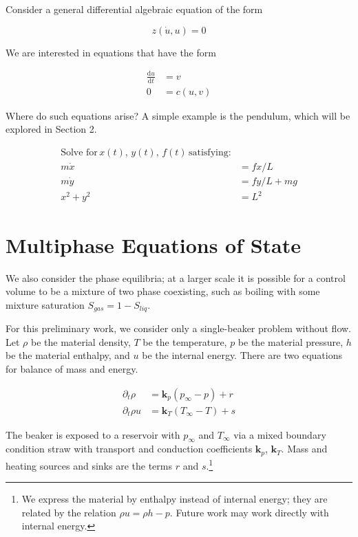 \documentclass[]{article}
\begin{document}
Consider a general differential algebraic equation of the form

\begin{equation}
z(\dot{u},u) = 0
\end{equation}

We are interested in equations that have the form

\begin{align}
\frac{\mathrm{d}u}{\mathrm{d}t} & = v \\
0 & = c(u,v)
\end{align}

Where do such equations arise? A simple example is the pendulum, which
will be explored in Section 2.

\begin{align}
\text{Solve for}\, x(t), \, y(t), \, f(t) \, \text{satisfying:} \\
m \dot{x} & = f x/L \\
m \dot{y} & = f y/L + m g \\
x^2 + y^2 & = L^2
\end{align}

\hypertarget{header-n3234}{%
\section{Multiphase Equations of State}\label{header-n3234}}

We also consider the phase equilibria; at a larger scale it is possible
for a control volume to be a mixture of two phase coexisting, such as
boiling with some mixture saturation \(S_{gas}=1-S_{liq}\).

For this preliminary work, we consider only a single-beaker problem
without flow. Let \(\rho\) be the material density, \(T\) be the
temperature, \(p\) be the material pressure, \(h\) be the material
enthalpy, and \(u\) be the internal energy. There are two equations for
balance of mass and energy.

\begin{align}
\partial_t \rho & = \mathbf{k}_p(p_\infty - p) + r\\
\partial_t \rho u & = \mathbf{k}_T(T_\infty-T) + s
\end{align}

The beaker is exposed to a reservoir with \(p_\infty\) and \(T_\infty\)
via a mixed boundary condition straw with transport and conduction
coefficients \(\mathbf{k}_p\), \(\mathbf{k}_T\). Mass and heating
sources and sinks are the terms \(r\) and \(s\).\footnote{We express the
  material by enthalpy instead of internal energy; they are related by
  the relation \(\rho u = \rho h - p\). Future work may work directly
  with internal energy.}
\end{document}
